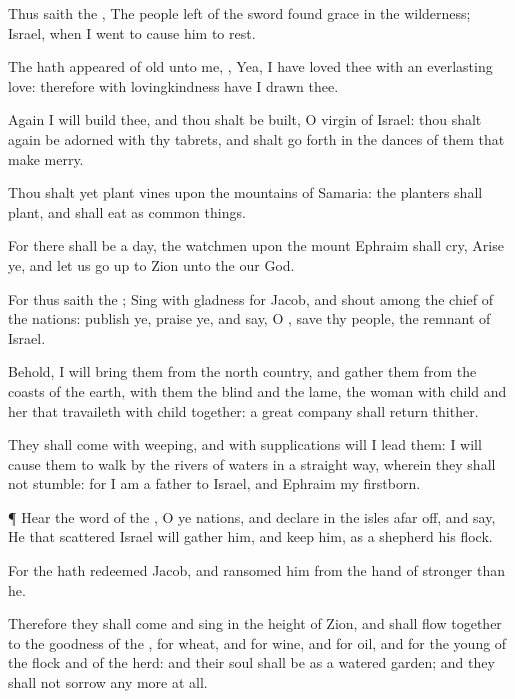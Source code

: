 {Thus
saith the
{}, The
people
{}
left of the
sword
found
grace in the
wilderness;
{}
Israel, when I
went to cause him to
rest.

The
{} hath
appeared of
old unto me,
{}, Yea, I have
loved thee with an
everlasting
love: therefore with
lovingkindness have I
drawn thee.

Again I will
build thee, and thou shalt be
built, O
virgin of
Israel: thou shalt again be
adorned with thy
tabrets, and shalt go
forth in the
dances of them that make
merry.

Thou shalt yet
plant
vines upon the
mountains of
Samaria: the
planters shall
plant, and shall eat
{} as common
things.

For there shall
be a
day,
{} the
watchmen upon the
mount
Ephraim shall
cry,
Arise ye, and let us go
up to
Zion unto the
{} our
God.

For thus
saith the
{};
Sing with
gladness for
Jacob, and
shout among the
chief of the
nations:
publish ye,
praise ye, and
say, O
{},
save thy
people, the
remnant of
Israel.

Behold, I will
bring them from the
north
country, and
gather them from the
coasts of the
earth,
{} with them the
blind and the
lame, the woman with
child and her that travaileth with
child
together: a
great
company shall
return thither.

They shall
come with
weeping, and with
supplications will I
lead them: I will cause them to
walk by the
rivers of
waters in a
straight
way, wherein they shall not
stumble: for I am a
father to
Israel, and
Ephraim
{} my
firstborn.


\par }{\PP {}¶
Hear the
word of the
{}, O ye
nations, and
declare
{} in the
isles afar
off, and
say, He that
scattered
Israel will
gather him, and
keep him, as a
shepherd
{} his
flock.

For the
{} hath
redeemed
Jacob, and
ransomed him from the
hand of
{}
stronger than he.

Therefore they shall
come and
sing in the
height of
Zion, and shall flow
together to the
goodness of the
{}, for
wheat, and for
wine, and for
oil, and for the
young of the
flock and of the
herd: and their
soul shall be as a
watered
garden; and they shall not
sorrow any
more at all.

}
